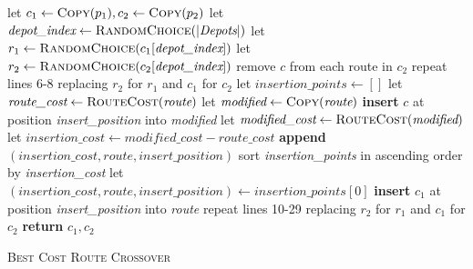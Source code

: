 \documentclass[paper=a4, fontsize=9pt]{scrartcl}
\begin{document}
\begin{multicols}{2}
{
\begin{minipage}{\linewidth-4mm}
\begin{algorithm}[H]
\footnotesize
\begin{algorithmic}[1]
    \State let $c_1 \gets \textsc{Copy}(p_1), c_2 \gets \textsc{Copy}(p_2)$
    \State let $\textit{depot\_index} \gets \textsc{RandomChoice}(\vert \textit{Depots} \vert)$
    \State let $r_1 \gets \textsc{RandomChoice}(c_1[\textit{depot\_index}])$
    \State let $r_2 \gets \textsc{RandomChoice}(c_2[\textit{depot\_index}])$
        \State remove $c$ from each route in $c_2$
    \EndFor
    \State repeat lines 6-8 replacing $r_2$ for $r_1$ and $c_1$ for $c_2$
        \State let $\textit{insertion\_points} \gets []$
                \State let $\textit{route\_cost} \gets \textsc{RouteCost}(\textit{route})$
                    \State let $\textit{modified} \gets \textsc{Copy}(\textit{route})$
                    \State \textbf{insert} $c$ at position \textit{insert\_position} into \textit{modified}
                        \State let $\textit{modified\_cost} \gets \textsc{RouteCost}(\textit{modified})$
                        \State let $\textit{insertion\_cost} \gets \textit{modified\_cost} - \textit{route\_cost}$
                        \State \textbf{append} $(\textit{insertion\_cost}, \textit{route}, \textit{insert\_position})$
                    \EndIf
                \EndFor
            \EndFor
        \EndFor
        \State sort \textit{insertion\_points} in ascending order by \textit{insertion\_cost}
        \State let $(\textit{insertion\_cost}, \textit{route}, \textit{insert\_position}) \gets \textit{insertion\_points}[0]$
        \State \textbf{insert} $c_1$ at position \textit{insert\_position} into \textit{route}
    \EndFor
    \State repeat lines 10-29 replacing $r_2$ for $r_1$ and $c_1$ for $c_2$
    \State \textbf{return} $c_1, c_2$
\EndFunction
\end{algorithmic}
\caption{\textsc{Best Cost Route Crossover}}
\label{alg:bcrc}
\end{algorithm}
\end{minipage}
}


\end{multicols}
\end{document}
